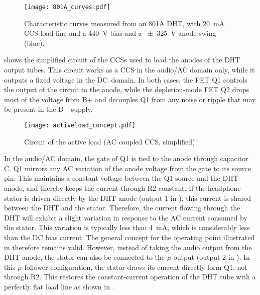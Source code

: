 \begin{figure}
\begin{center}
\texttt{[image: 801A\_curves.pdf]}
\caption{Characteristic curves measured from an 801A DHT, with \SI{20}{mA} CCS load line and a \SI{440}{V} bias and a \SI{\pm325}{V} anode swing (blue).}
\end{center}
\end{figure}

 shows the simplified circuit of the CCSs used to load the anodes of the DHT output tubes. This circuit works as a CCS in the audio/AC domain only, while it outputs a fixed voltage in the DC domain. In both cases, the FET Q1 controls the output of the circuit to the anode, while the depletion-mode FET Q2 drops most of the voltage from B+ and decouples Q1 from any noise or ripple that may be present in the B+ supply.\par

\begin{figure}
\begin{center}
\texttt{[image: activeload\_concept.pdf]}
\caption{Circuit of the active load (AC coupled CCS, simplified).}
\end{center}
\end{figure}

In the audio/AC domain, the gate of Q1 is tied to the anode through capacitor C. Q1 mirrors any AC variation of the anode voltage from the gate to its source pin. This maintains a constant voltage between the Q1 source and the DHT anode, and thereby keeps the current through R2 constant. If the headphone stator is driven directly by the DHT anode (output 1 in ), this current is shared between the DHT and the stator. Therefore, the current flowing through the DHT will exhibit a slight variation in response to the AC current consumed by the stator. This variation is typically less than \SI{4}{mA}\cite{osdeha_p8}, which is considerably less than the DC bias current. The general concept for the operating point illustrated in  therefore remains valid. However, instead of taking the audio output from the DHT anode, the stator can also be connected to the $\mu$-output (output 2 in ). In this $\mu$-follower configuration\cite{pimm_ccs,kimmel_mustage}, the stator draws its current directly form Q1, not through R2. This restores the constant-current operation of the DHT tube with a perfectly flat load line as shown in .\par

